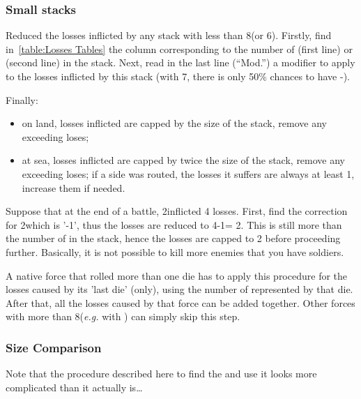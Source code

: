 \subsubsection{Small stacks}

Reduced the losses inflicted by any stack with less than 8\LD (or
6\ND). Firstly, find in~\ref{table:Losses Tables} the column corresponding to
the number of \ND (first line) or \LD (second line) in the stack. Next, read
in the last line (``Mod.'') a modifier to apply to the losses inflicted by
this stack (with 7\LD, there is only 50\% chances to have -\texttu).

Finally:
\begin{itemize}
\item on land, losses inflicted are capped by the size of the stack, remove
  any exceeding loses;
\item at sea, losses inflicted are capped by twice the size of the stack,
  remove any exceeding loses; if a side was routed, the losses it suffers are
  always at least 1\ND, increase them if needed.
\end{itemize}

\begin{exemple}
  Suppose that at the end of a battle, 2\LD inflicted 4 losses. First, find
  the correction for 2\LD which is '-1\texttu', thus the losses are reduced to
  4-1\texttu = 2\texttd. This is still more than the number of \LD in the
  stack, hence the losses are capped to 2 before proceeding
  further. Basically, it is not possible to kill more enemies that you have
  soldiers.
\end{exemple}

A native force that rolled more than one die has to apply this procedure for
the losses caused by its 'last die' (only), using the number of \LD
represented by that die. After that, all the losses caused by that force can
be added together. Other forces with more than 8\LD (\emph{e.g.} \TUR with
\Pashas) can simply skip this step.

\subsubsection{Size Comparison}
Note that the procedure described here to find the 
and use it looks more complicated than it actually is\ldots



